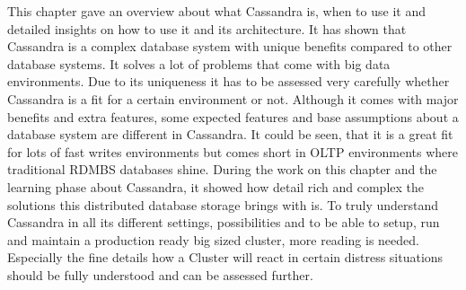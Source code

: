This chapter gave an overview about what Cassandra is, when to use it and detailed insights on how to use it and its architecture. It has shown that Cassandra is a complex database system with unique benefits compared to other database systems. It solves a lot of problems that come with big data environments. Due to its uniqueness it has to be assessed very carefully whether Cassandra is a fit for a certain environment or not. Although it comes with major benefits and extra features, some expected features and base assumptions about a database system are different in Cassandra. 
It could be seen, that it is a great fit for lots of fast writes environments but comes short in OLTP environments where traditional RDMBS databases shine.
During the work on this chapter and the learning phase about Cassandra, it showed how detail rich and complex the solutions this distributed database storage brings with is. To truly understand Cassandra in all its different settings, possibilities and to be able to setup, run and maintain a production ready big sized cluster, more reading is needed. Especially the fine details how a Cluster will react in certain distress situations should be fully understood and can be assessed further.

\cite{cassandra_paper}
